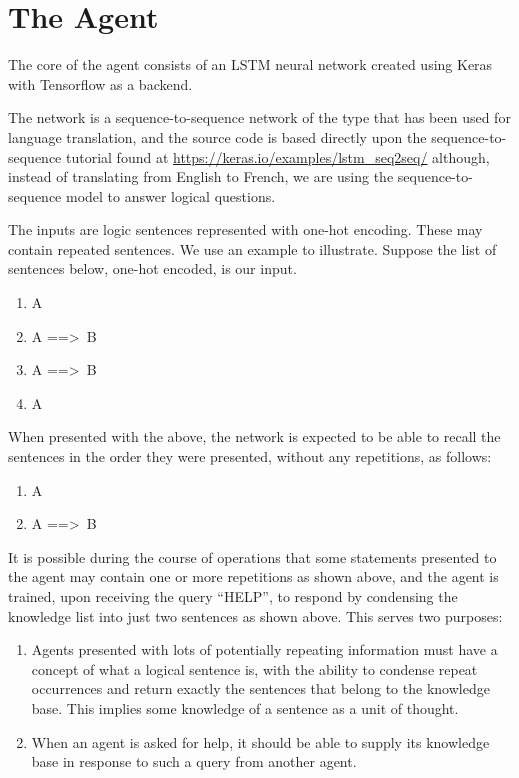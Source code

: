 \documentclass{article}
\begin{document}
\section{The Agent}
\label{the_agent}
The core of the agent consists of an LSTM neural network created
using Keras \cite{chollet2015keras}
with Tensorflow \cite{tensorflow2015-whitepaper}
as a backend.

The network is a sequence-to-sequence network of the type that has been used for language translation, and the source code is based directly upon the sequence-to-sequence tutorial found at \url{https://keras.io/examples/lstm_seq2seq/} although, instead of translating from English to French, we are using the sequence-to-sequence model to answer logical questions.

The inputs are logic sentences represented with one-hot encoding. These may contain repeated sentences. We use an example to illustrate. Suppose the list of sentences below, one-hot encoded, is our input.

\begin{enumerate}
	\item A
	\item A ==\textgreater \, B
	\item A ==\textgreater \, B
	\item A
\end{enumerate}

When presented with the above, the network is expected to be able to recall the sentences in the order they were presented, without any repetitions, as follows:

\begin{enumerate}
	\item A
	\item A ==\textgreater \, B
\end{enumerate}

It is possible during the course of operations that some statements presented to the agent may contain one or more repetitions as shown above, and the agent is trained, upon receiving the query ``HELP'', to respond by condensing the knowledge list into just two sentences as shown above. This serves two purposes:

\begin{enumerate}
	\item Agents presented with lots of potentially repeating information must have a concept of what a logical sentence is, with the ability to condense repeat occurrences and return exactly the sentences that belong to the knowledge base. This implies some knowledge of a sentence as a unit of thought.
	\item When an agent is asked for help, it should be able to supply its knowledge base in response to such a query from another agent.
\end{enumerate}
\end{document}
